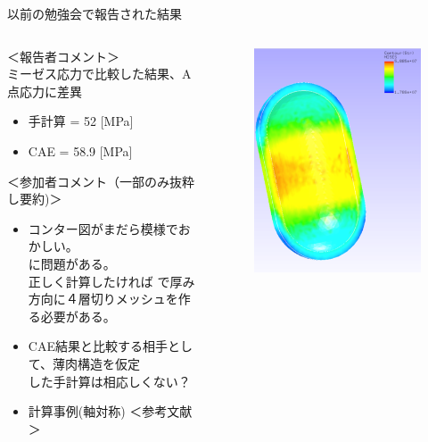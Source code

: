 \begin{frame}{以前の勉強会で報告された結果}
 
    \begin{columns}[t]
    \begin{column}{0.7\textwidth}
       ＜報告者コメント＞ \\
         ミーゼス応力で比較した結果、A点応力に差異 \\
         \begin{itemize}
            \item[①] 手計算 = 52 [\si{\mega\pascal}]  \\
            \item[②] CAE    = 58.9 [\si{\mega\pascal}]  \\
         \end{itemize}
        ＜参加者コメント（一部のみ抜粋し要約)＞ \\
         \begin{itemize}
            \item[①] コンター図がまだら模様でおかしい。\\
                     に問題がある。 \\
                     正しく計算したければ で厚み\\
                     方向に４層切りメッシュを作る必要がある。\\
            \item[②] CAE結果と比較する相手として、薄肉構造を仮定 \\
                     した手計算は相応しくない？
	    \item[③] 計算事例(軸対称) ＜参考文献\cite{Axsymmetric}＞
         \end{itemize}
    \end{column}
    \begin{column}{0.3\textwidth}
      \begin{figure}[htbp]
        \begin{center}
          \includegraphics[keepaspectratio,scale=1.5]{images/previous.png}

\end{center}
\end{figure}
\end{column}
\end{columns}
\end{frame}
